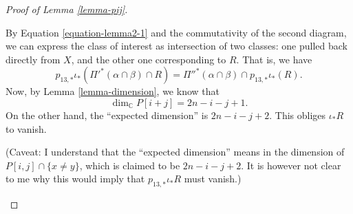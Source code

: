 \begin{proof}[Proof of Lemma \ref{lemma-pij}]
\begin{enumerate}
By Equation \ref{equation-lemma2-1}
and the commutativity of the second diagram,
we can express the class of interest as intersection
of two classes: one pulled back directly from $X$,
and the other one corresponding to $R$.
That is, we have
$$
p_{13,*}\iota_*({\Pi'}^* (\alpha\cap \beta)\cap R)
={\Pi''}^* (\alpha \cap \beta)\cap p_{13,*}\iota_*(R).
$$
Now, by Lemma \ref{lemma-dimension},
we know that
$$
\dim_{\mathbb{C}}P[i+j]=2n-i-j+1.
$$
On the other hand, the ``expected dimension''
is $2n-i-j+2$. This obliges $\iota_*R$ to vanish.

\medskip\noindent
(Caveat: I understand that the ``expected dimension'' 
means in \cite{Nakajima-lectures} the dimension of
$P[i,j]\cap \{x\neq y\}$, which is claimed to be
$2n-i-j+2$.
It is however not clear to me why this would imply
that $p_{13,*}\iota_*R$ must vanish.)

\end{enumerate}
\end{proof}





